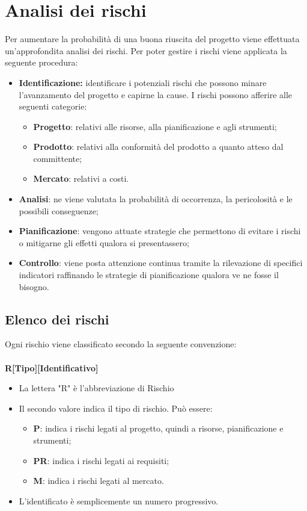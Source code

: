 \chapter{Analisi dei rischi}
Per aumentare la probabilità di una buona riuscita del progetto viene effettuata un'approfondita analisi dei rischi. Per poter gestire i rischi viene applicata la seguente procedura:
\begin{itemize}
	\item \textbf{Identificazione:} identificare i potenziali rischi che possono minare l'avanzamento del progetto e capirne la cause. I rischi possono afferire alle seguenti categorie:
	\begin{itemize}
		\item \textbf{Progetto}: relativi alle risorse, alla pianificazione e agli strumenti;
		\item \textbf{Prodotto}: relativi alla conformità del prodotto a quanto atteso dal committente;
		\item \textbf{Mercato}: relativi a costi.
	\end{itemize}
	\item \textbf{Analisi}: ne viene valutata la probabilità di occorrenza, la pericolosità e le possibili conseguenze;
	\item \textbf{Pianificazione}: vengono attuate strategie che permettono di evitare i rischi o mitigarne gli effetti qualora si presentassero;
	\item \textbf{Controllo}: viene posta attenzione continua tramite la rilevazione di specifici indicatori raffinando le strategie di pianificazione qualora ve ne fosse il bisogno.
\end{itemize}
\section{Elenco dei rischi}
Ogni rischio viene classificato secondo la seguente convenzione:\\\\
\centering \textbf{R[Tipo][Identificativo]}\\
\begin{itemize}
	\item La lettera "R" è l'abbreviazione di Rischio
	\item Il secondo valore indica il tipo di rischio. Può essere:
	\begin{itemize}
		\item \textbf{P}: indica i rischi legati al progetto, quindi a risorse, pianificazione e strumenti;
		\item \textbf{PR}: indica i rischi legati ai requisiti;
		\item \textbf{M}: indica i rischi legati al mercato.
	\end{itemize}
	\item L'identificato è semplicemente un numero progressivo.
\end{itemize}


